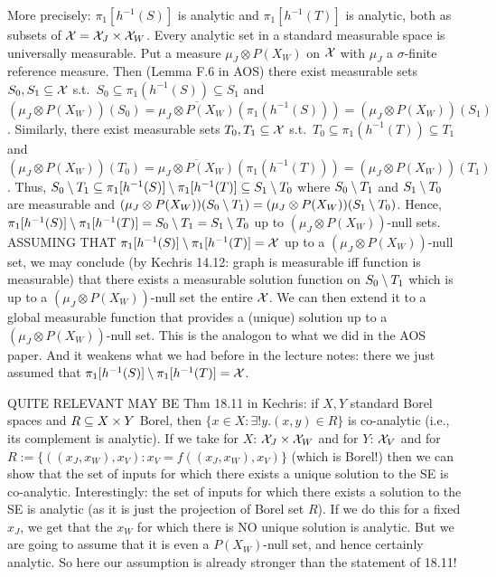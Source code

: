 {  More precisely: $\pi_1[h^{-1}(S)]$ is analytic and $\pi_1[h^{-1}(T)]$ is analytic, both as subsets of $\mathcal{X} = \mathcal{X}_J \times \mathcal{X}_W$.
  Every analytic set in a standard measurable space is universally measurable.
  Put a measure $\mu_J \otimes P(X_W)$ on $\mathcal{X}$ with $\mu_J$ a $\sigma$-finite reference measure.
  Then (Lemma F.6 in AOS) there exist measurable sets $S_0,S_1 \subseteq \mathcal{X}$ s.t.\ $S_0 \subseteq \pi_1(h^{-1}(S)) \subseteq S_1$ and
  $(\mu_J \otimes P(X_W))(S_0) = \overline{\mu_J \otimes P(X_W)}(\pi_1(h^{-1}(S))) = (\mu_J \otimes P(X_W))(S_1)$.
  Similarly, there exist measurable sets $T_0,T_1 \subseteq \mathcal{X}$ s.t.\ $T_0 \subseteq \pi_1(h^{-1}(T)) \subseteq T_1$ and
  $(\mu_J \otimes P(X_W))(T_0) = \overline{\mu_J \otimes P(X_W)}(\pi_1(h^{-1}(T))) = (\mu_J \otimes P(X_W))(T_1)$.
  Thus, 
  $S_0 \setminus T_1 \subseteq \pi_1[h^{-1}(S)] \setminus \pi_1[h^{-1}(T)] \subseteq S_1 \setminus T_0$
  where $S_0 \setminus T_1$ and $S_1 \setminus T_0$ are measurable and 
  $(\mu_J \otimes P(X_W))(S_0 \setminus T_1) = (\mu_J \otimes P(X_W))(S_1 \setminus T_0)$.
  Hence, $\pi_1[h^{-1}(S)] \setminus \pi_1[h^{-1}(T)] = S_0 \setminus T_1 = S_1 \setminus T_0$ up to $(\mu_J \otimes P(X_W))$-null sets.
  ASSUMING THAT $\pi_1[h^{-1}(S)] \setminus \pi_1[h^{-1}(T)] = \mathcal{X}$ up to a $(\mu_J \otimes P(X_W))$-null set, we may conclude 
  (by Kechris 14.12: graph is measurable iff function is measurable) that there exists a measurable solution
  function on $S_0 \setminus T_1$ which is up to a $(\mu_J \otimes P(X_W))$-null set the entire $\mathcal{X}$.
  We can then extend it to a global measurable function that provides a (unique) solution up to a $(\mu_J \otimes P(X_W))$-null set.
  This is the analogon to what we did in the AOS paper.
  And it weakens what we had before in the lecture notes: there we just assumed that $\pi_1[h^{-1}(S)] \setminus \pi_1[h^{-1}(T)] = \mathcal{X}$.

  QUITE RELEVANT MAY BE Thm 18.11 in Kechris: if $X,Y$ standard Borel spaces and $R \subseteq X \times Y$ Borel, then $\{x \in X : \exists! y. (x,y)\in R\}$ is co-analytic (i.e., its complement is analytic).
  If we take for $X$: $\mathcal{X}_J \times \mathcal{X}_W$ and for $Y$: $\mathcal{X}_V$ and for $R := \{((x_J,x_W),x_V) : x_V = f((x_J,x_W),x_V)\}$ (which is Borel!) then we can show that the set of inputs for which there exists a unique solution to the SE is co-analytic.
  Interestingly: the set of inputs for which there exists a solution to the SE is analytic (as it is just the projection of Borel set $R$).
  If we do this for a fixed $x_J$, we get that the $x_W$ for which there is NO unique solution is analytic.
  But we are going to assume that it is even a $P(X_W)$-null set, and hence certainly analytic.
  So here our assumption is already stronger than the statement of 18.11!

}
